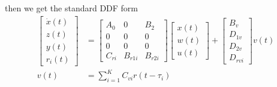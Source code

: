 \documentclass[twocolumn]{autart}    %
\begin{document}
then we get the standard DDF form
\begin{equation}
    \begin{aligned}
        \begin{bmatrix}
            \dot{x}(t) \\
            z(t) \\
            y(t) \\
            r_{i}(t)
        \end{bmatrix} & = \begin{bmatrix}
            A_{0} & 0 & B_{2}\\
            0 & 0 & 0\\
            0 & 0 & 0\\
            C_{ri} & B_{r1i} & B_{r2i}
        \end{bmatrix}\begin{bmatrix}
            x(t) \\
            w(t) \\
            u(t) 
        \end{bmatrix} 
        +  \begin{bmatrix}
            B_{v} \\
            D_{1v} \\
            D_{2v} \\
            D_{rvi}
        \end{bmatrix}v(t)\\
        v(t) &= \sum_{i = 1}^{K}C_{vi}r(t-\tau_{i})
    \end{aligned}
\end{equation}
\end{document}
